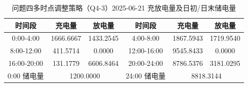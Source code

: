 \begin{table}[htbp]
\centering
\caption{问题四多时点调整策略（Q4-3）2025-06-21 充放电量及日初/日末储电量}\label{tab:q4-3-storage}
\normalsize\setlength{\tabcolsep}{5pt}
\begin{tabular}{@{}cccccc@{}}
\toprule
时间段 & 充电量 & 放电量 & 时间段 & 充电量 & 放电量 \\
\midrule
0:00-4:00 & 1666.6667 & 1433.2545 & 4:00-8:00 & 1867.5943 & 1719.9540 \\
8:00-12:00 & 411.5714 & 0.0000 & 12:00-16:00 & 9545.8433 & 0.0000 \\
16:00-20:00 & 131.1779 & 6606.8464 & 20:00-24:00 & 8786.5376 & 3181.0295 \\
0:00 储电量 & \multicolumn{2}{c}{1200.0000} & 24:00 储电量 & \multicolumn{2}{c}{8818.3144} \\
\bottomrule
\end{tabular}
\end{table}
